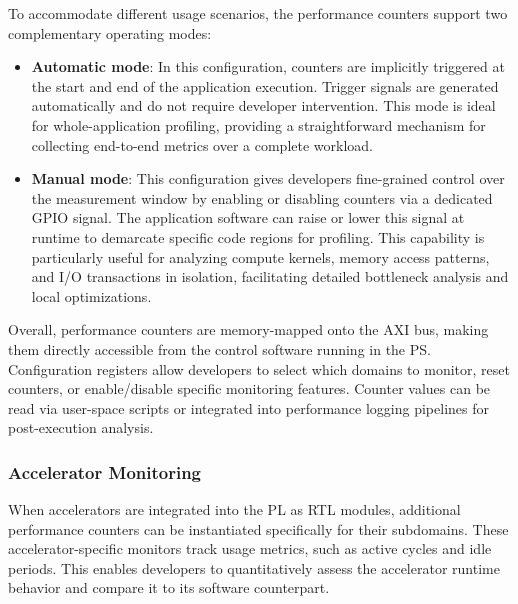                 To accommodate different usage scenarios, the performance counters support two complementary operating modes:

                \vspace{-1em}
                \begin{itemize}
                    \item \textbf{Automatic mode}: In this configuration, counters are implicitly triggered at the start and end of the application execution. Trigger signals are generated automatically and do not require developer intervention. This mode is ideal for whole-application profiling, providing a straightforward mechanism for collecting end-to-end metrics over a complete workload.
                
                    \item \textbf{Manual mode}: This configuration gives developers fine-grained control over the measurement window by enabling or disabling counters via a dedicated GPIO signal. The application software can raise or lower this signal at runtime to demarcate specific code regions for profiling. This capability is particularly useful for analyzing compute kernels, memory access patterns, and I/O transactions in isolation, facilitating detailed bottleneck analysis and local optimizations.
                \end{itemize}
                \vspace{-1em}
                
                Overall, performance counters are memory-mapped onto the AXI bus, making them directly accessible from the control software running in the PS. Configuration registers allow developers to select which domains to monitor, reset counters, or enable/disable specific monitoring features. Counter values can be read via user-space scripts or integrated into performance logging pipelines for post-execution analysis.
                
            \subsubsection*{Accelerator Monitoring}
            
                When accelerators are integrated into the PL as RTL modules, additional performance counters can be instantiated specifically for their subdomains. These accelerator-specific monitors track usage metrics, such as active cycles and idle periods. This enables developers to quantitatively assess the accelerator runtime behavior and compare it to its software counterpart.
                
